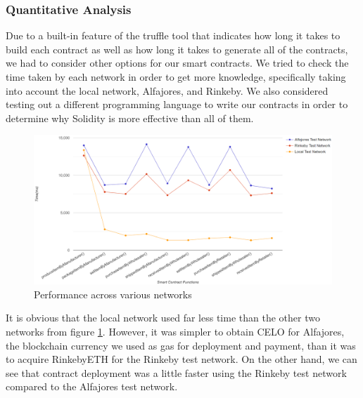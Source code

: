 \subsubsection{Quantitative Analysis}

Due to a built-in feature of the truffle tool that indicates how long it takes to build each contract as well as how long it takes to generate all of the contracts, we had to consider other options for our smart contracts. We tried to check the time taken by each network in order to get more knowledge, specifically taking into account the local network, Alfajores, and Rinkeby. We also considered testing out a different programming language to write our contracts in order to determine why Solidity is more effective than all of them.

\begin{figure}[h]
\centering
  \includegraphics[width=13.5cm]{includes/figures/graph.png} 
  \caption{Performance across various networks}
  \label{Testing on networks}
\end{figure}

\vspace{.5cm}

It is obvious that the local network used far less time than the other two networks from figure \ref{Testing on networks}. However, it was simpler to obtain CELO for Alfajores, the blockchain currency we used as gas for deployment and payment, than it was to acquire RinkebyETH for the Rinkeby test network. On the other hand, we can see that contract deployment was a little faster using the Rinkeby test network compared to the Alfajores test network.

\vspace{.5cm}

